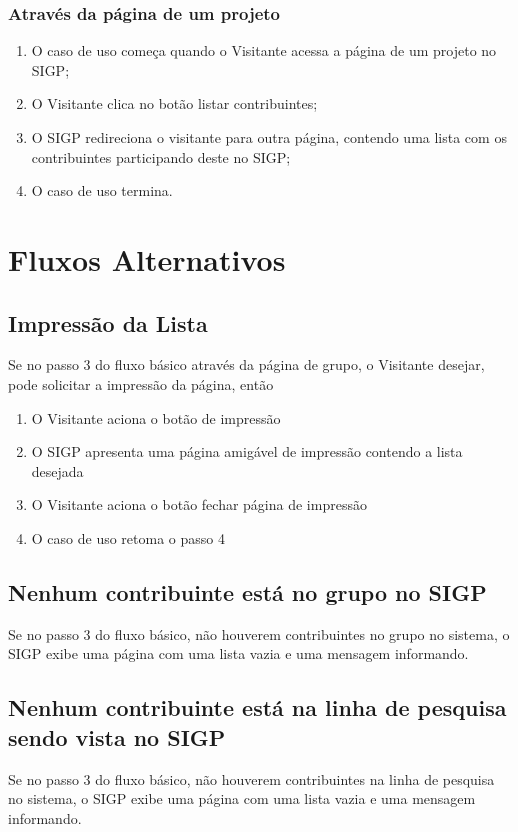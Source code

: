 \documentclass[11pt, a4paper,oneside]{book}
\begin{document}
\subsubsection{Através da página de um projeto}
\begin{enumerate}
\item O caso de uso começa quando o Visitante acessa a página de um projeto no SIGP;
\item O Visitante clica no botão listar contribuintes;
\item O SIGP redireciona o visitante para outra página, contendo uma lista com os contribuintes participando deste no SIGP;
\item O caso de uso termina.
\end{enumerate}

\section{Fluxos Alternativos}

\subsection{Impressão da Lista}
Se no passo $3$ do fluxo básico através da página de grupo, o Visitante desejar, pode solicitar a impressão da página, então

\begin{enumerate}
\item O Visitante aciona o botão de impressão
\item O SIGP apresenta uma página amigável de impressão contendo a lista desejada
\item O Visitante aciona o botão fechar página de impressão
\item O caso de uso retoma o passo 4
\end{enumerate}

\subsection{Nenhum contribuinte está no grupo no SIGP}
Se no passo $3$ do fluxo básico, não houverem contribuintes no grupo no sistema, o SIGP exibe uma página com uma lista vazia e uma mensagem informando.

\subsection{Nenhum contribuinte está na linha de pesquisa sendo vista no SIGP}
Se no passo $3$ do fluxo básico, não houverem contribuintes na linha de pesquisa no sistema, o SIGP exibe uma página com uma lista vazia e uma mensagem informando.
\end{document}
